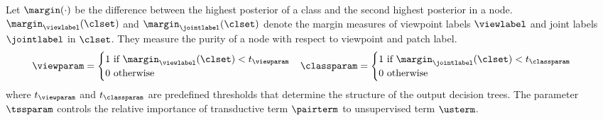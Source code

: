 Let $\margin(\cdot)$ be the difference between the highest posterior of a class and the second highest posterior in a node. $\margin_{\viewlabel}(\clset)$ and $\margin_{\jointlabel}(\clset)$ denote the margin measures of viewpoint labels $\viewlabel$ and joint labels $\jointlabel$ in $\clset$. They measure the purity of a node with respect to viewpoint and patch label.   
\begin{equation}
	\hspace{-3mm}
	\begin{array}{l@{}r}
	\viewparam  = 
	\begin{cases}
		1\mbox{ if } \margin_{\viewlabel}(\clset) < t_{\viewparam} \\
		0\mbox{ otherwise }
	\end{cases} & 
	\classparam = 
	\begin{cases}
		1\mbox{ if } \margin_{\jointlabel}(\clset) < t_{\classparam} \\
		0\mbox{ otherwise}
	\end{cases}
		\end{array}
	\label{eq:switchparam}
\end{equation}
where $t_{\viewparam}$ and $t_{\classparam}$ are predefined thresholds that determine the structure of the output decision trees. The parameter $\tssparam$ controls the relative importance of transductive term $\pairterm$ to unsupervised term $\usterm$.  



